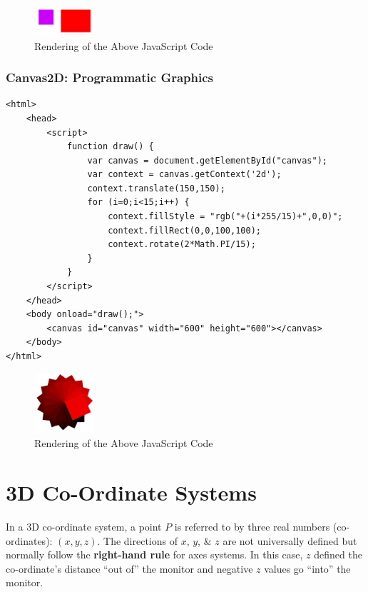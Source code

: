 \documentclass[a4paper,11pt]{article}
\begin{document}
\begin{figure}[H]
    \centering
    \includegraphics[width=0.2\textwidth]{images/canvas2d_scaling.png}
    \caption{Rendering of the Above JavaScript Code}
\end{figure}

\subsubsection{Canvas2D: Programmatic Graphics}
\begin{verbatim}
<html>
    <head>
        <script>
            function draw() {
                var canvas = document.getElementById("canvas");
                var context = canvas.getContext('2d');
                context.translate(150,150);
                for (i=0;i<15;i++) {
                    context.fillStyle = "rgb("+(i*255/15)+",0,0)";
                    context.fillRect(0,0,100,100);
                    context.rotate(2*Math.PI/15);
                }
            }
        </script>
    </head>
    <body onload="draw();">
        <canvas id="canvas" width="600" height="600"></canvas>
    </body>
</html>
\end{verbatim}

\begin{figure}[H]
    \centering
    \includegraphics[width=0.2\textwidth]{images/canvas2d_programmatic_graphics.png}
    \caption{Rendering of the Above JavaScript Code}
\end{figure}

\section{3D Co-Ordinate Systems}
In a 3D co-ordinate system, a point $P$ is referred to by three real numbers (co-ordinates): $(x,y,z)$.
The directions of $x$, $y$, \& $z$ are not universally defined but normally follow the \textbf{right-hand rule}
for axes systems.
In this case, $z$ defined the co-ordinate's distance ``out of'' the monitor and negative $z$ values go ``into''
the monitor.
\end{document}
